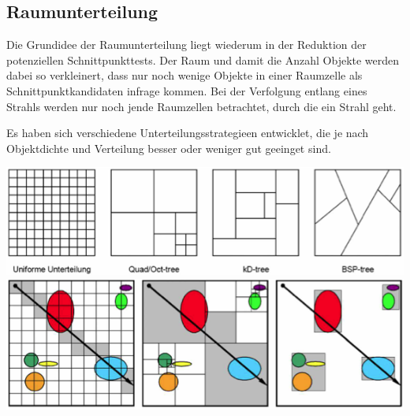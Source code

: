 \documentclass[10pt]{article}
\begin{document}
\subsection{Raumunterteilung}
Die Grundidee der Raumunterteilung liegt wiederum in der Reduktion der potenziellen Schnittpunkttests. Der Raum und damit  die Anzahl Objekte werden dabei so verkleinert, dass nur noch wenige Objekte in einer Raumzelle als Schnittpunktkandidaten infrage kommen. Bei der Verfolgung entlang eines Strahls werden nur noch jende Raumzellen betrachtet, durch die ein Strahl geht. 

Es haben sich verschiedene Unterteilungsstrategieen entwicklet, die je nach Objektdichte und Verteilung besser oder weniger gut geeinget sind.
\begin{center}
	\includegraphics[scale=0.5]{raumunterteilung.png}
	\includegraphics[scale=0.5]{schnitttest.png}
\end{center}
\end{document}
